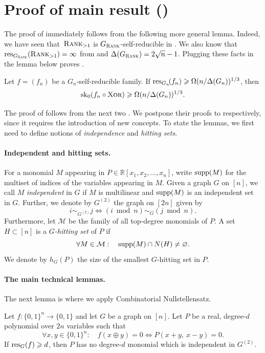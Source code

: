 \documentclass{article}
\begin{document}
\section{Proof of main result ()}
 The proof of  immediately follows from the following more general lemma. 
  Indeed, we have seen that~$\operatorname{\textsc{Rank}}_{>1}$ is $G_{\operatorname{\textsc{Rank}}}$-self-reducible in . We also know that $\operatorname{res}_{G_{\operatorname{\textsc{Rank}}}}(\operatorname{\textsc{Rank}}_{>1}) = \infty$ from  and $\Delta(G_{\operatorname{\textsc{Rank}}}) = 2\sqrt{n}-1$. Plugging these facts in the lemma below proves .


\begin{boxlemma}\label{lem:main-tec}
     Let $f=(f_n)$ be a $G_n$-self-reducible family. If $\operatorname{res}_{G_n}\!(f_n) \geqslant \Omega(n/\Delta(G_n))^{1/3}$, then
    \[
        \operatorname{sk}_0(f_n\circ\operatorname{\textsc{Xor}}) \geqslant \Omega(n/\Delta(G_n))^{1/3}.
    \]
\end{boxlemma}

The proof of  follows from the next two . We postpone their proofs to  respectively, since it requires the introduction of new concepts. To state the lemmas, we first need to define notions of \emph{independence} and \emph{hitting sets}. 
 \paragraph{Independent and hitting sets.}
For a monomial $M$ appearing in $P\in \mathbb{R}[x_1,x_2,\dots, x_n]$, write  $\operatorname{supp}(M)$ for the multiset of indices of the variables appearing in $M$. Given a graph $G$ on $[n]$, we call $M$ \emph{independent} in $G$ if $M$ is multilinear and $\operatorname{supp}(M)$ is an independent set in $G$.
Further, we denote by $G^{(2)}$ the graph on $[2n]$ given by
\[
    i \sim_{G^{(2)}} j \iff (i\ \operatorname{mod}\ n)\sim_G (j\ \operatorname{mod}\ n).
\]
Furthermore, let $\mathcal{M}$ be the family of all top-degree monomials of $P$.   A set $H\subset [n]$  is a \emph{$G$-hitting set} of $P$ if 
    \[
        \forall M\in \mathcal{M}: \quad \operatorname{supp}(M)\cap N(H)\neq \varnothing.
    \]
    We denote by $h_G(P)$ the size of the smallest $G$-hitting set in $P$.
\paragraph{The main technical lemmas.}
The next lemma is where we apply Combinatorial Nullstellensatz.
\begin{boxlemma}\label{lem:xor-null}
    Let $f\colon\{0,1\}^n\to \{0,1\}$ and let $G$ be a graph on $[n]$. 
    Let $P$ be a real, degree-$d$ polynomial over $2n$ variables such that
    \[
        \forall x,y\in \{0,1\}^n\colon\quad
        f(x \oplus y) = 0 \iff P(x+y,\ x-y) = 0.
    \]
    If $\operatorname{res}_G(f) \geqslant d$, then $P$ has no degree-$d$ monomial 
    which is independent in $G^{(2)}$.
\end{boxlemma}
 
\end{document}
